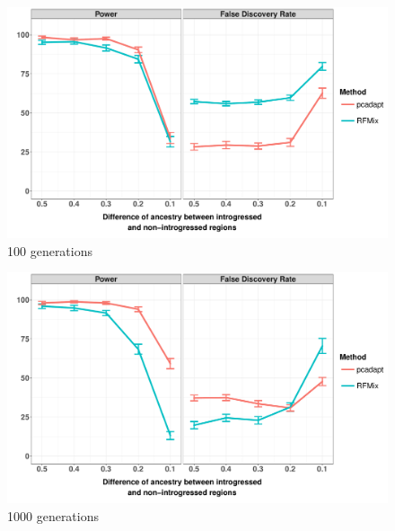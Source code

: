 \documentclass[12pt,twoside]{reedthesis}
\begin{document}
  \begin{figure}
  \includegraphics[width=500px]{figure/facet_admixture_setting_100_gen} \caption{100 generations}\label{fig:ras100g}
  \end{figure}
  
  \begin{figure}
  \includegraphics[width=500px]{figure/facet_admixture_setting_1000_gen} \caption{1000 generations}\label{fig:ras1000g}
  \end{figure}
  
\end{document}
